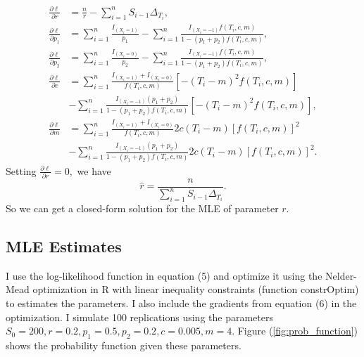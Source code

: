 \documentclass[11pt]{article}
\begin{document}
\begin{equation}
    \begin{split}
    \frac{\partial \ell}{\partial r} &= \frac{n}{r} - \sum_{i=1}^n S_{i-1} \Delta_{T_i},\\
    \frac{\partial \ell}{\partial p_1} &= \sum_{i=1}^n \frac{I_{(X_i = 1)}}{p_1} -\sum_{i=1}^n \frac{I_{(X_i = -1)} f(T_i, c,m)}{1-(p_1 + p_2) f(T_i, c, m)}, \\
    \frac{\partial \ell}{\partial p_2} &= \sum_{i=1}^n \frac{I_{(X_i = 0)}}{p_2} -\sum_{i=1}^n \frac{I_{(X_i = -1)} f(T_i, c,m)}{1-(p_1 + p_2) f(T_i, c, m)}, \\
    \frac{\partial \ell}{\partial c} & = \sum_{i=1}^n \frac{I_{(X_i = 1)} + I_{(X_i = 0)}}{f(T_i, c, m)} [-(T_i -m)^2 f(T_i, c,m)] \\
    & - \sum_{i=1}^n \frac{I_{(X_i = -1)} (p_1 + p_2)}{1-(p_1 + p_2 ) f(T_i, c, m)} [-(T_i -m)^2 f(T_i, c,m)], \\
    \frac{\partial \ell}{\partial m} & = \sum_{i=1}^n \frac{I_{(X_i = 1)} + I_{(X_i = 0)}}{f(T_i, c, m)} 2c(T_i-m)[f(T_i,c,m)]^2 \\
    &- \sum_{i=1}^n \frac{I_{(X_i = -1)} (p_1 + p_2)}{1-(p_1 + p_2 ) f(T_i, c, m)}2c(T_i-m)[f(T_i,c,m)]^2.
    \end{split}
\end{equation}
Setting $\frac{\partial \ell}{\partial r} = 0,$ we have 
$$\hat{r} = \frac{n}{\sum_{i=1}^n S_{i-1} \Delta_{T_i}}.$$
So we can get a closed-form solution for the MLE of parameter $r$.

\subsection*{MLE Estimates}
I use the log-likelihood function in equation (5) and optimize it using the Nelder-Mead optimization in R with linear inequality constraints (function constrOptim) to estimates the parameters. I also include the gradients from equation (6) in the optimization. I simulate 100 replications using the parameters $S_0 = 200, r = 0.2, p_1 = 0.5, p_2 = 0.2, c = 0.005, m = 4$. Figure (\ref{fig:prob_function}) shows the probability function given these parameters.
\end{document}
